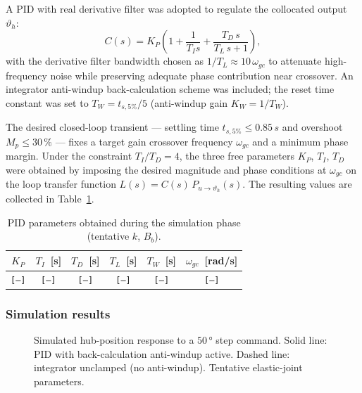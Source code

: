 \documentclass[11pt]{article}
\newcommand{\thh}{\vartheta_h}
\newcommand{\wgc}{\omega_{gc}}
\begin{document}
A PID with real derivative filter was adopted to regulate the collocated output~$\thh$:
\begin{equation}
    C(s) = K_P\!\left(1 + \frac{1}{T_I s} + \frac{T_D\,s}{T_L\,s + 1}\right),
    \label{eq:pid}
\end{equation}
with the derivative filter bandwidth chosen as $1/T_L \approx 10\,\wgc$ to attenuate
high-frequency noise while preserving adequate phase contribution near crossover.
An integrator anti-windup back-calculation scheme was included; the reset time constant
was set to $T_W = t_{s,5\%}/5$ (anti-windup gain $K_W = 1/T_W$).

The desired closed-loop transient — settling time $t_{s,5\%} \leq 0.85\,\si{s}$ and
overshoot $M_p \leq 30\,\%$ — fixes a target gain crossover frequency $\wgc$ and
a minimum phase margin.  Under the constraint $T_I/T_D = 4$, the three free parameters
$K_P$, $T_I$, $T_D$ were obtained by imposing the desired magnitude and phase conditions
at $\wgc$ on the loop transfer function $L(s) = C(s)\,P_{u\to\thh}(s)$.
The resulting values are collected in Table~\ref{tab:pid_params_sim}.

\begin{table}[H]
\centering
\caption{PID parameters obtained during the simulation phase (tentative $k$, $B_b$).}
\label{tab:pid_params_sim}
\begin{tabular}{cccccc}
\toprule
$K_P$ & $T_I$~[s] & $T_D$~[s] & $T_L$~[s] & $T_W$~[s] & $\wgc$~[rad/s] \\
\midrule
\texttt{[---]} & \texttt{[---]} & \texttt{[---]} & \texttt{[---]} & \texttt{[---]} & \texttt{[---]} \\
\bottomrule
\end{tabular}
\end{table}

\subsubsection*{Simulation results}


\begin{figure}[H]
    \centering
    \caption{Simulated hub-position response to a $50\,\si{\degree}$ step command.
             Solid line: PID with back-calculation anti-windup active.
             Dashed line: integrator unclamped (no anti-windup).
             Tentative elastic-joint parameters.}
    \label{fig:pid_aw_50_sim}
\end{figure}
\end{document}
